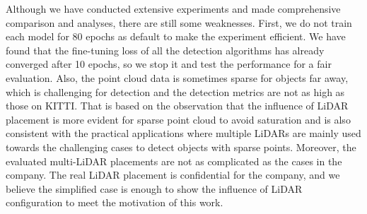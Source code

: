 \documentclass[10pt,twocolumn,letterpaper]{article}
\def\confName{CVPR}
\def\confYear{2022}
\begin{document}
Although we have conducted extensive experiments and made comprehensive comparison and analyses, there are still some weaknesses. First, we do not train each model for 80 epochs as default to make the experiment efficient. We have found that  the fine-tuning loss of all the detection algorithms has already converged after 10 epochs,  so we stop it and test the performance for a fair evaluation. Also, the point cloud data is sometimes sparse for objects far away, which is challenging for detection and the detection metrics are not as high as those on KITTI. That is based on the observation that the influence of LiDAR placement is more evident for sparse point cloud to avoid saturation and is also consistent with the practical applications where multiple LiDARs are mainly used towards the challenging cases to detect objects with sparse points. Moreover, the evaluated multi-LiDAR placements are not as complicated as the cases in the company. The real LiDAR placement is confidential for the company, and we believe the simplified case is enough to show the influence of LiDAR configuration to meet the motivation of this work.





\end{document}
